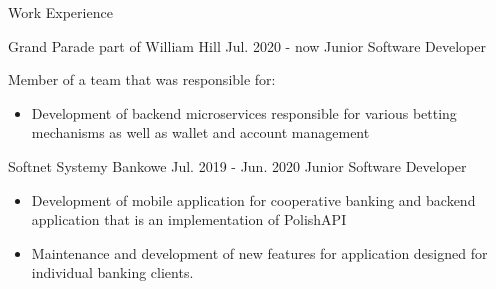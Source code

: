\documentclass{resume} %
\begin{document}

\begin{rSection}
{Work Experience}

\begin{rSubsection}
{Grand Parade part of William Hill}
{Jul. 2020 - now}
{Junior Software Developer}

Member of a team that was responsible for:

\begin{itemize}

\item{Development of backend microservices responsible for various betting mechanisms as well as wallet and account management}

\end{itemize}
\end{rSubsection}

\begin{rSubsection}
{Softnet Systemy Bankowe}
{Jul. 2019 - Jun. 2020}
{Junior Software Developer}

\begin{itemize}

\item{Development of mobile application for cooperative banking and backend application that is an implementation of PolishAPI}

\item{Maintenance and development of new features for application designed for individual banking clients.}

\end{itemize}
\end{rSubsection}

\end{rSection}
\end{document}
